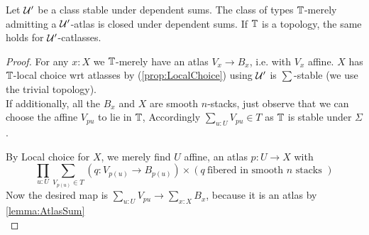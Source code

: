 \begin{theorem}{\label{thm:atlasStableSum}}
	Let $\mathcal{U}'$ be a class stable under dependent sums.
	The class of types $\mathbb{T}$-merely admitting a $\mathcal{U}'$-atlas is closed under dependent sums. If $\mathbb{T}$ is a topology, the same holds for $\mathcal{U}'$-catlasses.
\end{theorem}
\begin{proof}
	For any $x : X$ we $\mathbb{T}$-merely have an atlas $V_x \to B_x$, i.e. with $V_x$ affine. %
	$X$ has $\mathbb{T}$-local choice wrt atlasses by (\ref{prop:LocalChoice}) using $\mathcal{U}'$ is $\sum$-stable (we use the trivial topology).\\
	If additionally, all the $B_x$ and $X$ are smooth $n$-stacks, just observe that we can choose the affine $V_{p u}$ to lie in $\mathbb{T}$, Accordingly $\sum_{u : U} V_{p u} \in T$ as $\mathbb{T}$ is stable under $\Sigma$.

	By Local choice for $X$, we merely find $U$ affine, an atlas $p : U \to X$ %
	with
	\[
	\prod_{u : U} \sum_{V_{p(u)} \in T} (q : V_{p(u)} \to B_{p(u)}) \times (q \ \text{fibered in smooth } n \text{ stacks } )
	\]
	Now the desired map is $\sum_{u : U} V_{p u} \to \sum_{x : X} B_x$, because it is  an atlas %
	by \ref{lemma:AtlasSum} \\
\end{proof}
%
